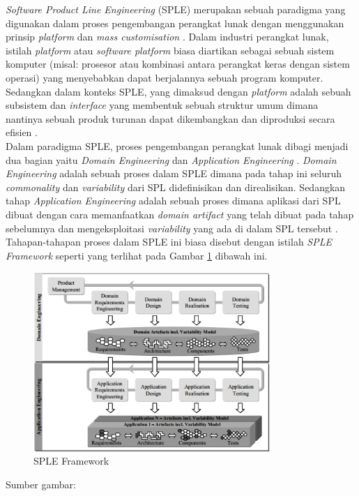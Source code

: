 \textit{Software Product Line Engineering} (SPLE) merupakan sebuah paradigma yang digunakan dalam proses pengembangan perangkat lunak dengan menggunakan prinsip \textit{platform} dan \textit{mass customisation} \citep[p.~14]{pohl2005software}. Dalam industri perangkat lunak, istilah \textit{platform} atau \textit{software platform} biasa diartikan sebagai sebuah sistem komputer (misal: prosesor atau kombinasi antara perangkat keras dengan sistem operasi) yang menyebabkan dapat berjalannya sebuah program komputer. Sedangkan dalam konteks SPLE, yang dimaksud dengan \textit{platform} adalah sebuah subsistem dan \textit{interface} yang membentuk sebuah struktur umum dimana nantinya sebuah produk turunan dapat dikembangkan dan diproduksi secara efisien \citep[p.~15]{pohl2005software}. \\

Dalam paradigma SPLE, proses pengembangan perangkat lunak dibagi menjadi dua bagian yaitu \textit{Domain Engineering} dan \textit{Application Engineering} \citep[p.~21]{pohl2005software}. \textit{Domain Engineering} adalah sebuah proses dalam SPLE dimana pada tahap ini seluruh \textit{commonality} dan \textit{variability} dari SPL didefinisikan dan direalisikan. Sedangkan tahap \textit{Application Engineering} adalah sebuah proses dimana aplikasi dari SPL dibuat dengan cara memanfaatkan \textit{domain artifact} yang telah dibuat pada tahap sebelumnya dan mengeksploitasi \textit{variability} yang ada di dalam SPL tersebut \cite{metzger2007variability}. Tahapan-tahapan proses dalam SPLE ini biasa disebut dengan istilah \textit{SPLE Framework} seperti yang terlihat pada Gambar \ref{fig:spleFramework} dibawah ini. \\

\begin{figure}
    \centering
    \includegraphics[width=0.8\textwidth]
        {img/sple-process.png}
    \caption{SPLE Framework}
    \label{fig:spleFramework}
\end{figure}
\vspace{-0.8cm}
\begin{center}
{\small Sumber gambar: \citep{pohl2005software}}
\end{center}

